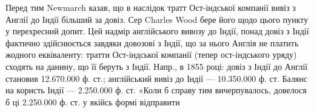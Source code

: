 Перед тим Newmarch казав, що в наслідок тратт Ост-індської компанії
вивіз з Англії до Індії більший за довіз. Сер Charles Wood бере його щодо
цього пункту у перехресний допит. Цей надмір англійського вивозу до Індії, понад
довіз з Індії фактично здійснюється завдяки довозові з Індії, що за нього Англія
не платить жодного еквіваленту: тратти Ост-індської компанії (тепер ост-індського
уряду) сходять на данину, що її беруть з Індії. Напр., в 1855 році:
довіз з Індії до Англії становив 12.670.000 ф. ст.; англійський вивіз до Індії —
10.350.000 ф. ст. Балянс на користь Індії — 2.250.000 ф. ст. «Коли б справу
тим вичерпувалось, довелося б ці 2.250.000 ф. ст. у якійсь формі відправити
\parbreak{}  %
